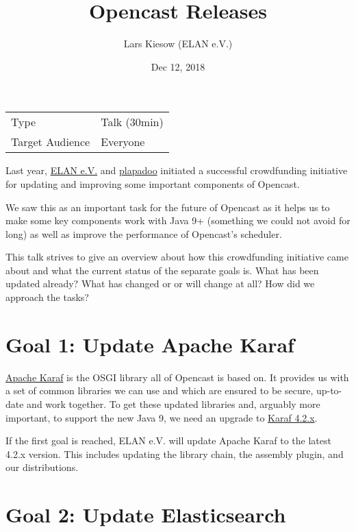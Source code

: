 \documentclass[a4paper]{article}
\title{Opencast Releases}
\date{Dec 12, 2018}
\author{Lars Kiesow (ELAN e.V.)}
\begin{document}
\maketitle

\begin{center}
\begin{tabular}{ll}
\toprule
	Type            & Talk (30min) \\
	Target Audience & Everyone \\
\bottomrule
\end{tabular}
\end{center}

\vspace{1em}

Last year, \href{https://elan-ev.de}{ELAN e.V.} and
\href{https://plapadoo.com}{plapadoo} initiated a successful crowdfunding
initiative for updating and improving some important components of Opencast.

We saw this as an important task for the future of Opencast as it helps us to
make some key components work with Java 9+ (something we could not avoid for
long) as well as improve the performance of Opencast's scheduler.

This talk strives to give an overview about how this crowdfunding initiative
came about and what the current status of the separate goals is. What has been
updated already? What has changed or or will change at all? How did we approach the tasks?


\section*{Goal 1: Update Apache Karaf}

\href{https://karaf.apache.org/}{Apache Karaf} is the OSGI library all of Opencast is based on. It
provides us with a set of common libraries we can use and which are
ensured to be secure, up-to-date and work together. To get these
updated libraries and, arguably more important, to support the new Java
9, we need an upgrade to \href{https://karaf.apache.org/download.html}{Karaf 4.2.x}.

If the first goal is reached, ELAN e.V. will update Apache Karaf to the
latest 4.2.x version. This includes updating the library chain, the
assembly plugin, and our distributions.


\section*{Goal 2: Update Elasticsearch}
\end{document}
